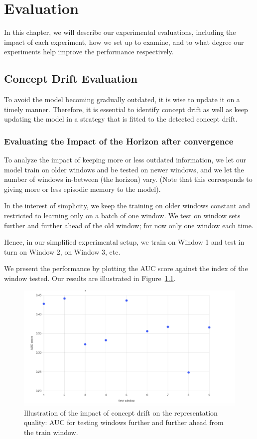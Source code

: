 \chapter{Evaluation}
\label{chapter:evaluation}
In this chapter, we will describe our experimental evaluations, including the impact of each experiment, how we set up to examine, and to what degree our experiments help improve the performance respectively.

\section{Concept Drift Evaluation}

To avoid the model becoming gradually outdated, it is wise to update it on a timely manner. Therefore, it is essential to identify concept drift as well as keep updating the model in a strategy that is fitted to the detected concept drift.

\subsection{Evaluating the Impact of the Horizon after convergence}
To analyze the impact of keeping more or less outdated information, we let our model train on older windows and be tested on newer windows, and we let the number of windows in-between (the horizon) vary. (Note that this corresponds to giving more or less episodic memory to the model).

In the interest of simplicity, we keep the training on older windows constant and restricted to learning only on a batch of one window. We test on window sets further and further ahead of the old window; for now only one window each time.

Hence, in our simplified experimental setup, we train on Window 1 and test in turn on Window 2, on Window 3, etc.

We present the performance by plotting the AUC score against the index of the window tested.
Our results are illustrated in Figure~\ref{fig:AUC_onFurther_windows}.

\begin{figure}[htbp!]
	\centering
	\includegraphics[width=0.6\linewidth]{images/plots/concept_drift_capture.png}
	\caption{Illustration of the impact of concept drift on the representation quality: AUC for testing windows further and further ahead from the train window.}
	\label{fig:AUC_onFurther_windows}
\end{figure}

